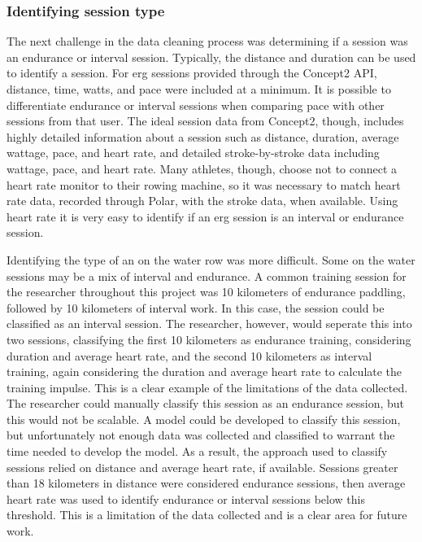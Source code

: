 \subsubsection{Identifying session type}
The next challenge in the data cleaning process was determining if a session was an endurance or interval session. Typically, the distance and duration can be used to identify a session. For erg sessions provided through the Concept2 API, distance, time, watts, and pace were included at a minimum. It is possible to differentiate endurance or interval sessions when comparing pace with other sessions from that user. The ideal session data from Concept2, though, includes highly detailed information about a session such as distance, duration, average wattage, pace, and heart rate, and detailed stroke-by-stroke data including wattage, pace, and heart rate. Many athletes, though, choose not to connect a heart rate monitor to their rowing machine, so it was necessary to match heart rate data, recorded through Polar, with the stroke data, when available. Using heart rate it is very easy to identify if an erg session is an interval or endurance session.

Identifying the type of an on the water row was more difficult. Some on the water sessions may be a mix of interval and endurance. A common training session for the researcher throughout this project was 10 kilometers of endurance paddling, followed by 10 kilometers of interval work. In this case, the session could be classified as an interval session. The researcher, however, would seperate this into two sessions, classifying the first 10 kilometers as endurance training, considering duration and average heart rate, and the second 10 kilometers as interval training, again considering the duration and average heart rate to calculate the training impulse. This is a clear example of the limitations of the data collected. The researcher could manually classify this session as an endurance session, but this would not be scalable. A model could be developed to classify this session, but unfortunately not enough data was collected and classified to warrant the time needed to develop the model. As a result, the approach used to classify sessions relied on distance and average heart rate, if available. Sessions greater than 18 kilometers in distance were considered endurance sessions, then average heart rate was used to identify endurance or interval sessions below this threshold. This is a limitation of the data collected and is a clear area for future work.


